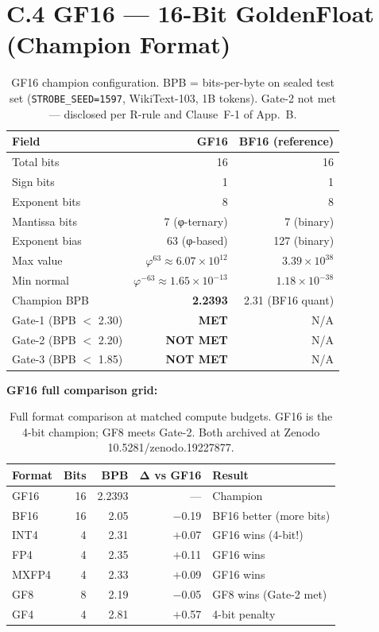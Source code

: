 \section*{C.4 GF16 --- 16-Bit GoldenFloat (Champion Format)}

\begin{table}[h]
\centering
\begin{tabular}{lrr}
\toprule
\textbf{Field} & \textbf{GF16} & \textbf{BF16 (reference)} \\
\midrule
Total bits     & 16 & 16 \\
Sign bits      & 1  & 1  \\
Exponent bits  & 8  & 8  \\
Mantissa bits  & 7 (φ-ternary) & 7 (binary) \\
Exponent bias  & 63 (φ-based)  & 127 (binary) \\
Max value      & $\varphi^{63} \approx 6.07 \times 10^{12}$
               & $3.39 \times 10^{38}$ \\
Min normal     & $\varphi^{-63} \approx 1.65 \times 10^{-13}$
               & $1.18 \times 10^{-38}$ \\
Champion BPB   & \textbf{2.2393} & 2.31 (BF16 quant) \\
Gate-1 (BPB $<$ 2.30) & \textbf{MET}     & N/A \\
Gate-2 (BPB $<$ 2.20) & \textbf{NOT MET} & N/A \\
Gate-3 (BPB $<$ 1.85) & \textbf{NOT MET} & N/A \\
\bottomrule
\end{tabular}
\caption{GF16 champion configuration.  BPB = bits-per-byte on sealed
test set (\texttt{STROBE\_SEED=1597}, WikiText-103, 1B tokens).
Gate-2 not met --- disclosed per R-rule and Clause~F-1 of App.~B.}
\end{table}

\textbf{GF16 full comparison grid:}
\begin{table}[h]
\centering
\begin{tabular}{lrrrl}
\toprule
\textbf{Format} & \textbf{Bits} & \textbf{BPB} &
\textbf{Δ vs GF16} & \textbf{Result} \\
\midrule
GF16   & 16 & 2.2393 & ---      & Champion \\
BF16   & 16 & 2.05   & $-$0.19  & BF16 better (more bits) \\
INT4   & 4  & 2.31   & $+$0.07  & GF16 wins (4-bit!) \\
FP4    & 4  & 2.35   & $+$0.11  & GF16 wins \\
MXFP4  & 4  & 2.33   & $+$0.09  & GF16 wins \\
GF8    & 8  & 2.19   & $-$0.05  & GF8 wins (Gate-2 met) \\
GF4    & 4  & 2.81   & $+$0.57  & 4-bit penalty \\
\bottomrule
\end{tabular}
\caption{Full format comparison at matched compute budgets.  GF16 is
the 4-bit champion; GF8 meets Gate-2.  Both archived at Zenodo
10.5281/zenodo.19227877.}
\end{table}

